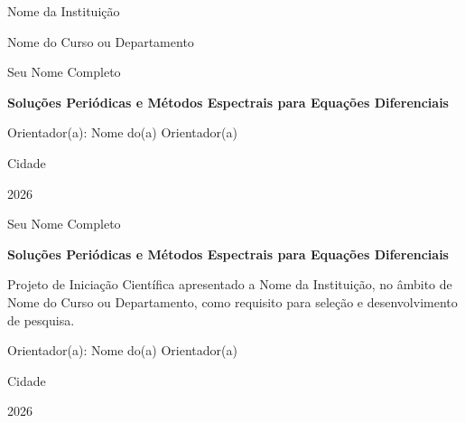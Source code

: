 \documentclass[12pt,a4paper]{report}
\newcommand{\instituicao}{Nome da Instituição}
\newcommand{\curso}{Nome do Curso ou Departamento}
\newcommand{\autor}{Seu Nome Completo}
\newcommand{\titulo}{Soluções Periódicas e Métodos Espectrais para Equações Diferenciais}
\newcommand{\orientador}{Nome do(a) Orientador(a)}
\newcommand{\cidade}{Cidade}
\newcommand{\ano}{2026}
\begin{document}
\hypersetup{pageanchor=false}

\begin{titlepage}
  \begin{center}
    {\large \instituicao \par}
    \vspace{0.4cm}
    {\large \curso \par}
    \vfill
    {\Large \autor \par}
    \vspace{1.5cm}
    {\LARGE \textbf{\titulo} \par}
    \vfill
    {\large Orientador(a): \orientador \par}
    \vfill
    {\large \cidade \par}
    {\large \ano \par}
  \end{center}
\end{titlepage}

\begin{titlepage}
  \begin{center}
    {\large \autor \par}
    \vspace{1.5cm}
    {\LARGE \textbf{\titulo} \par}
  \end{center}

  \vfill

  \begin{flushright}
    \begin{minipage}{0.58\textwidth}
      Projeto de Iniciação Científica apresentado a \instituicao, no âmbito de \curso, como requisito para seleção e desenvolvimento de pesquisa.
    \end{minipage}
  \end{flushright}

  \vspace{1.2cm}

  \begin{center}
    {\large Orientador(a): \orientador \par}
    \vfill
    {\large \cidade \par}
    {\large \ano \par}
  \end{center}
\end{titlepage}

\clearpage
\hypersetup{pageanchor=true}
\end{document}

